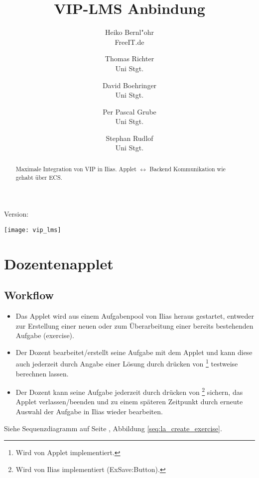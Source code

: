 \documentclass[12pt,a4paper]{article}
\newcommand{\button}[1]{\fbox{\texttt{#1}}}
\begin{document}
\title{VIP-LMS Anbindung}
\author{Heiko Bernl"ohr\\FreeIT.de \and Thomas Richter\\Uni Stgt. \and David Boehringer\\Uni Stgt. \and Per Pascal Grube\\Uni Stgt. \and Stephan Rudlof\\Uni Stgt. }
\maketitle
\begin{center}
  Version: \gitVtag\\
\end{center}
\begin{abstract}
  Maximale Integration von VIP in Ilias. Applet $\leftrightarrow$ Backend
  Kommunikation wie gehabt über ECS.
\end{abstract}

\vspace{\fill}
\begin{center}
\texttt{[image: vip\_lms]}
\end{center}
\vspace{\fill}

\newpage

\section{Dozentenapplet}
\subsection{Workflow}
\begin{itemize}
  \item Das Applet wird aus einem Aufgabenpool von Ilias heraus gestartet,
    entweder zur Erstellung einer neuen oder zum Überarbeitung einer bereits
    bestehenden Aufgabe (exercise).
  \item Der Dozent bearbeitet/erstellt seine Aufgabe mit dem Applet und kann
    diese auch jederzeit durch Angabe einer Lösung durch drücken von
    \button{berechnen}\footnote{Wird von Applet implementiert.} testweise
    berechnen lassen.
  \item Der Dozent kann seine Aufgabe jederzeit durch drücken von
    \button{speichern}\footnote{Wird von Ilias implementiert (ExSave:Button).}
    sichern, das Applet verlassen/beenden und zu einem späteren Zeitpunkt durch
    erneute Auswahl der Aufgabe in Ilias wieder bearbeiten.
\end{itemize}
Siehe Sequenzdiagramm auf Seite \pageref{seq:la_create_exercise}, Abbildung \ref{seq:la_create_exercise}.
\end{document}

